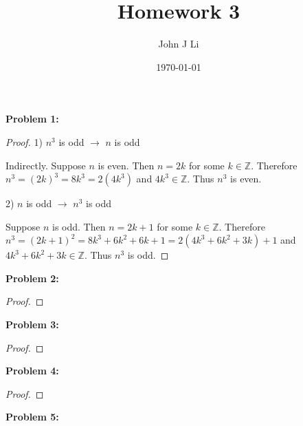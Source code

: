 \documentclass{article}
\title{Homework 3}
\date{\today}
\author{John J Li}
\begin{document}
    \maketitle
    \newpage


    \textbf{Problem 1:}

    \begin{proof}
        1) $n^3$ is odd $\rightarrow$ $n$ is odd
        
        Indirectly. Suppose $n$ is even. Then $n=2k$ for some $k\in\mathbb{Z}$.
        Therefore $n^3=(2k)^3=8k^3=2(4k^3)$ and $4k^3 \in\mathbb{Z}$. Thus $n^3$ is even.

        2) $n$ is odd $\rightarrow$ $n^3$ is odd

        Suppose $n$ is odd. Then $n=2k+1$ for some $k\in\mathbb{Z}$. Therefore 
        $n^3=(2k+1)^2=8k^3+6k^2+6k+1=2(4k^3+6k^2+3k)+1$ and $4k^3+6k^2+3k \in\mathbb{Z}$.
        Thus $n^3$ is odd.
    \end{proof}


    \textbf{Problem 2:}

    \begin{proof}
        
    \end{proof}


    \textbf{Problem 3:}

    \begin{proof}
        
    \end{proof}


    \textbf{Problem 4:}

    \begin{proof}
        
    \end{proof}


    \textbf{Problem 5:}
\end{document}
